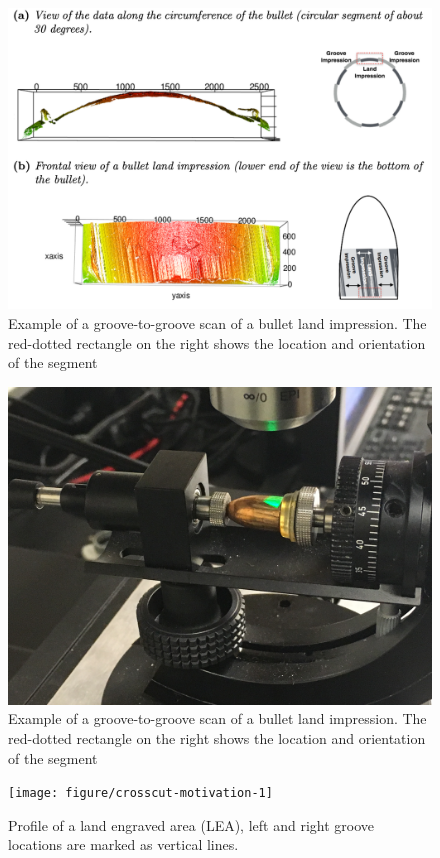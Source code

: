 \documentclass[12pt]{article}\usepackage[]{graphicx}\usepackage[]{color}
\newenvironment{knitrout}{}{} %
\theoremstyle{nonumberplain}
\begin{document}
\begin{knitrout}
\color{fgcolor}\begin{figure}

{\centering \includegraphics[width=0.5\linewidth]{../images/hare-bullet-anatomy-image} 

}

\caption[Example of a groove-to-groove scan of a bullet land impression]{Example of a groove-to-groove scan of a bullet land impression. The red-dotted rectangle on the right shows the location and orientation of the segment}\label{fig:hare-bullet-anatomy-image-1}
\end{figure}

\begin{figure}

{\centering \includegraphics[width=0.5\linewidth]{../images/microscope-bullet} 

}

\caption[Example of a groove-to-groove scan of a bullet land impression]{Example of a groove-to-groove scan of a bullet land impression. The red-dotted rectangle on the right shows the location and orientation of the segment}\label{fig:hare-bullet-anatomy-image-2}
\end{figure}


\end{knitrout}

\begin{knitrout}
\color{fgcolor}\begin{figure}

{\centering \texttt{[image: figure/crosscut-motivation-1]} 

}

\caption[Profile of a land engraved area (LEA), left and right groove locations are marked as vertical lines]{Profile of a land engraved area (LEA), left and right groove locations are marked as vertical lines.}\label{fig:crosscut-motivation}
\end{figure}


\end{knitrout}
\end{document}
